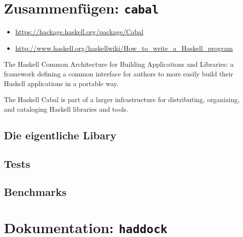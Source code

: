 \section{Zusammenfügen: \texttt{cabal}}
\begin{itemize}
  \item \url{https://hackage.haskell.org/package/Cabal}
  \item \url{http://www.haskell.org/haskellwiki/How_to_write_a_Haskell_program}
\end{itemize}
The Haskell Common Architecture for Building Applications and Libraries: a
framework defining a common interface for authors to more easily build their
Haskell applications in a portable way.

The Haskell Cabal is part of a larger infrastructure for distributing,
organizing, and cataloging Haskell libraries and tools.


%

\subsection{Die eigentliche Libary}
%

\subsection{Tests}
%

\subsection{Benchmarks}
%

\section{Dokumentation: \texttt{haddock}}
